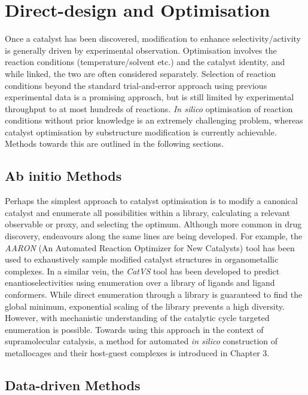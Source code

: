 \documentclass[../main.tex]{subfiles}
\begin{document}
\section{Direct-design and Optimisation}

Once a catalyst has been discovered, modification to enhance selectivity/activity is generally driven by experimental observation. Optimisation involves the reaction conditions (temperature/solvent etc.) and the catalyst identity, and while linked, the two are often considered separately. Selection of reaction conditions beyond the standard trial-and-error approach using previous experimental data is a promising approach,\cite{hase2021gryffin, Shields2021} but is still limited by experimental throughput to at most hundreds of reactions.\cite{Koinuma2004, Mennen2019} \emph{In silico} optimisation of reaction conditions without prior knowledge is an extremely challenging problem, whereas catalyst optimisation by substructure modification is currently achievable. Methods towards this are outlined in the following sections.

\subsection{Ab initio Methods}

Perhaps the simplest approach to catalyst optimisation is to modify a canonical catalyst and enumerate all possibilities within a library, calculating a relevant observable or proxy, and selecting the optimum. Although more common in drug discovery,\cite{Kitchen2004} endeavours along the same lines are being developed. For example, the \emph{AARON} (An Automated Reaction Optimizer for New Catalysts) tool has been used to exhaustively sample modified catalyst structures in organometallic complexes.\cite{Guan2018} In a similar vein, the \emph{CatVS} tool has been developed to predict enantioselectivities using enumeration over a library of ligands and ligand conformers.\cite{Rosales2018} While direct enumeration through a library is guaranteed to find the global minimum, exponential scaling of the library prevents a high diversity. However, with mechanistic understanding of the catalytic cycle targeted enumeration is possible. Towards using this approach in the context of supramolecular catalysis, a method for automated \emph{in silico} construction of metallocages and their host-guest complexes is introduced in Chapter 3. 

\subsection{Data-driven Methods}
\end{document}
